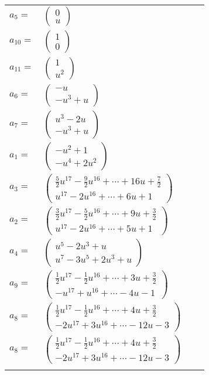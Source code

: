 \documentclass[1p]{elsarticle_modified}
\theoremstyle{definition}
\begin{document}
\begin{tabular}{m{7pt} m{180pt} m{7pt} m{180pt} }
\flushright $a_{5}=$&$\begin{pmatrix}0\\u\end{pmatrix}$ \\
\flushright $a_{10}=$&$\begin{pmatrix}1\\0\end{pmatrix}$ \\
\flushright $a_{11}=$&$\begin{pmatrix}1\\u^2\end{pmatrix}$ \\
\flushright $a_{6}=$&$\begin{pmatrix}- u\\- u^3+u\end{pmatrix}$ \\
\flushright $a_{7}=$&$\begin{pmatrix}u^3-2 u\\- u^3+u\end{pmatrix}$ \\
\flushright $a_{1}=$&$\begin{pmatrix}- u^2+1\\- u^4+2 u^2\end{pmatrix}$ \\
\flushright $a_{3}=$&$\begin{pmatrix}\frac{5}{2} u^{17}-\frac{9}{2} u^{16}+\cdots+16 u+\frac{7}{2}\\u^{17}-2 u^{16}+\cdots+6 u+1\end{pmatrix}$ \\
\flushright $a_{2}=$&$\begin{pmatrix}\frac{3}{2} u^{17}-\frac{5}{2} u^{16}+\cdots+9 u+\frac{3}{2}\\u^{17}-2 u^{16}+\cdots+5 u+1\end{pmatrix}$ \\
\flushright $a_{4}=$&$\begin{pmatrix}u^5-2 u^3+u\\u^7-3 u^5+2 u^3+u\end{pmatrix}$ \\
\flushright $a_{9}=$&$\begin{pmatrix}\frac{1}{2} u^{17}-\frac{1}{2} u^{16}+\cdots+3 u+\frac{3}{2}\\- u^{17}+u^{16}+\cdots-4 u-1\end{pmatrix}$ \\
\flushright $a_{8}=$&$\begin{pmatrix}\frac{1}{2} u^{17}-\frac{1}{2} u^{16}+\cdots+4 u+\frac{3}{2}\\-2 u^{17}+3 u^{16}+\cdots-12 u-3\end{pmatrix}$\\ \flushright $a_{8}=$&$\begin{pmatrix}\frac{1}{2} u^{17}-\frac{1}{2} u^{16}+\cdots+4 u+\frac{3}{2}\\-2 u^{17}+3 u^{16}+\cdots-12 u-3\end{pmatrix}$\\&\end{tabular}
\end{document}
